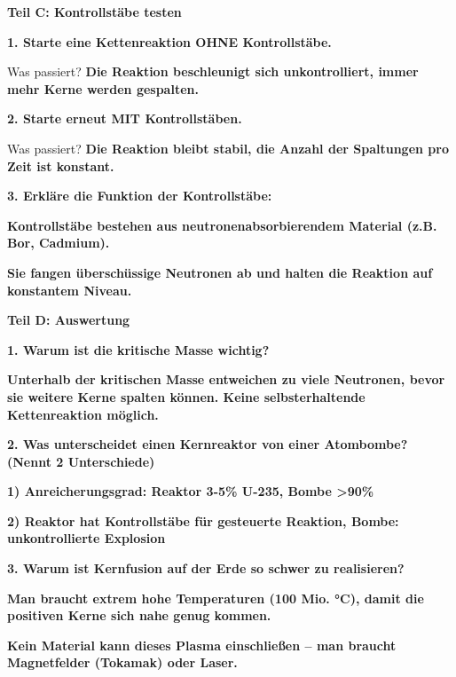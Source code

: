 \documentclass[10pt, a4paper]{article}
\newcommand{\fachfarbe}{physik}
\newcommand{\lsg}[1]{\textcolor{loesung}{\textbf{#1}}}
\newcommand{\abschnitt}[1]{%
    \vspace{8pt}\noindent\textbf{\textcolor{\fachfarbe}{#1}}\vspace{4pt}
}
\begin{document}
\vspace{12pt}

\abschnitt{Teil C: Kontrollstäbe testen}

\textbf{1. Starte eine Kettenreaktion OHNE Kontrollstäbe.}

Was passiert? \lsg{Die Reaktion beschleunigt sich unkontrolliert, immer mehr Kerne werden gespalten.}

\vspace{8pt}

\textbf{2. Starte erneut MIT Kontrollstäben.}

Was passiert? \lsg{Die Reaktion bleibt stabil, die Anzahl der Spaltungen pro Zeit ist konstant.}

\vspace{8pt}

\textbf{3. Erkläre die Funktion der Kontrollstäbe:}

\lsg{Kontrollstäbe bestehen aus neutronenabsorbierendem Material (z.B. Bor, Cadmium).}

\vspace{4pt}
\lsg{Sie fangen überschüssige Neutronen ab und halten die Reaktion auf konstantem Niveau.}

\vspace{12pt}

\abschnitt{Teil D: Auswertung}

\textbf{1. Warum ist die kritische Masse wichtig?}

\vspace{4pt}
\lsg{Unterhalb der kritischen Masse entweichen zu viele Neutronen, bevor sie weitere Kerne spalten können. Keine selbsterhaltende Kettenreaktion möglich.}

\vspace{8pt}

\textbf{2. Was unterscheidet einen Kernreaktor von einer Atombombe? (Nennt 2 Unterschiede)}

\vspace{4pt}
\lsg{1) Anreicherungsgrad: Reaktor 3-5\% U-235, Bombe >90\%}

\vspace{4pt}
\lsg{2) Reaktor hat Kontrollstäbe für gesteuerte Reaktion, Bombe: unkontrollierte Explosion}

\vspace{8pt}

\textbf{3. Warum ist Kernfusion auf der Erde so schwer zu realisieren?}

\vspace{4pt}
\lsg{Man braucht extrem hohe Temperaturen (100 Mio. °C), damit die positiven Kerne sich nahe genug kommen.}

\vspace{4pt}
\lsg{Kein Material kann dieses Plasma einschließen – man braucht Magnetfelder (Tokamak) oder Laser.}
\end{document}
